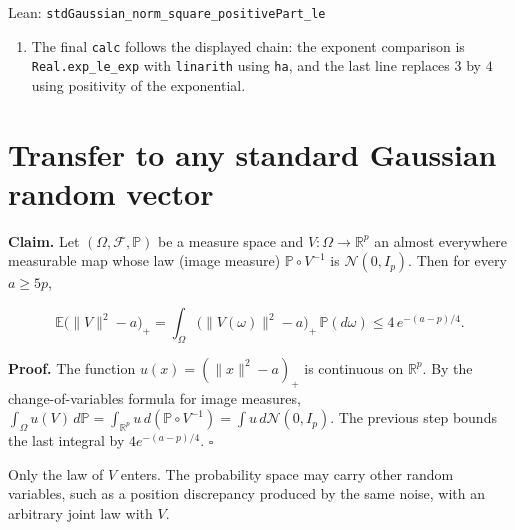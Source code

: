 \documentclass[11pt,a4paper]{article}
\begin{document}
\begin{leanbox}{Lean: \texttt{stdGaussian\_\allowbreak{}norm\_\allowbreak{}square\_\allowbreak{}positivePart\_\allowbreak{}le}}
\begin{enumerate}
\item The final \texttt{calc} follows the displayed chain: the exponent comparison is \texttt{Real.\allowbreak{}exp\_\allowbreak{}le\_\allowbreak{}exp} with \texttt{linarith} using \texttt{ha}, and the last line replaces \(3\) by \(4\) using positivity of the exponential.

\end{enumerate}
\end{leanbox}

\section{\texorpdfstring{Transfer to any standard Gaussian random vector}{Transfer to any standard Gaussian random vector}}


\textbf{Claim.} Let \((\Omega,\mathcal F,\mathbb P)\) be a measure space and \(V:\Omega\to\mathbb R^p\) an almost everywhere measurable map whose law (image measure) \(\mathbb P\circ V^{-1}\) is \(\mathcal N(0,I_p)\). Then for every \(a\ge5p\),


\[\mathbb E\bigl(\|V\|^2-a\bigr)_+=\int_\Omega\bigl(\|V(\omega)\|^2-a\bigr)_+\,\mathbb P(d\omega)\le4\,e^{-(a-p)/4}.\]


\textbf{Proof.} The function \(u(x)=(\|x\|^2-a)_+\) is continuous on \(\mathbb R^p\). By the change-of-variables formula for image measures, \(\int_\Omega u(V)\,d\mathbb P=\int_{\mathbb R^p}u\,d(\mathbb P\circ V^{-1})=\int u\,d\mathcal N(0,I_p)\). The previous step bounds the last integral by \(4e^{-(a-p)/4}\). \(\square\)




Only the law of \(V\) enters. The probability space may carry other random variables, such as a position discrepancy produced by the same noise, with an arbitrary joint law with \(V\).
\end{document}
